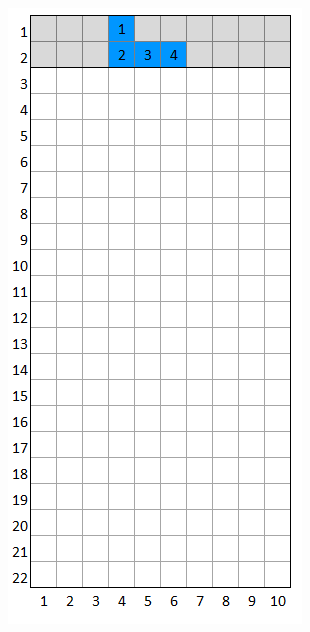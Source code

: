 \documentclass[a4paper]{article}
\begin{document}
	\begin{minipage}{0.26\textwidth}
		\centering
		\includegraphics[scale=0.4]{resources/img/minos/mino_blue}
		\label{fig:mino-blue}
	\end{minipage}%
\end{document}
